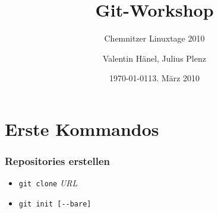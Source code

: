 \documentclass{beamer}
\date{\today}
\title{Git-Workshop}
\subtitle{Chemnitzer Linuxtage 2010}
\author{Valentin Hänel, Julius Plenz}
\date{13. März 2010}
\begin{document}
\frame{\titlepage}






\section{Erste Kommandos}



\begin{frame}
 \frametitle{Repositories erstellen}
  


\begin{itemize}
  \item \texttt{git clone} \emph{URL}
  \item \texttt{git init [-{}-bare]}
\end{itemize}

  
 \end{frame}
\end{document}
